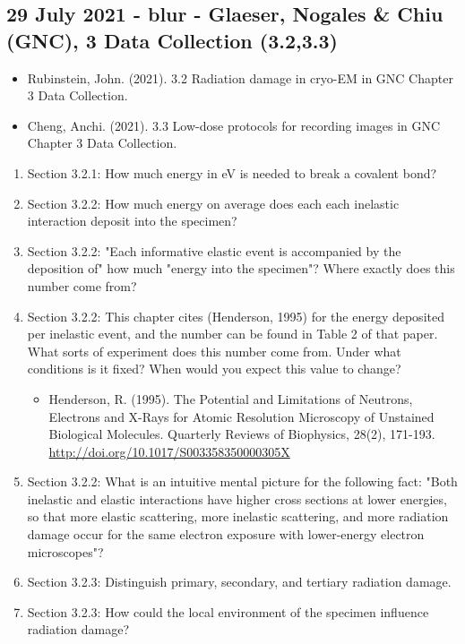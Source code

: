 \documentclass[11pt, oneside]{article}   	%
\begin{document}
\subsection{29 July 2021 - blur - Glaeser, Nogales \& Chiu (GNC), 3 Data Collection (3.2,3.3)}
\begin{itemize}
	\item Rubinstein, John. (2021). 3.2 Radiation damage in cryo-EM in GNC Chapter 3 Data Collection.
	\item Cheng, Anchi. (2021). 3.3 Low-dose protocols for recording images in GNC Chapter 3 Data Collection. 
\end{itemize}
\begin{enumerate}
	\item Section 3.2.1: How much energy in eV is needed to break a covalent bond?
	\item Section 3.2.2: How much energy on average does each each inelastic interaction deposit into the specimen?
	\item Section 3.2.2: "Each informative elastic event is accompanied by the deposition of" how much "energy into the specimen"? Where exactly does this number come from?
	\item Section 3.2.2: This chapter cites (Henderson, 1995) for the energy deposited per inelastic event, and the number can be found in Table 2 of that paper. What sorts of experiment does this number come from. Under what conditions is it fixed? When would you expect this value to change?
	\begin{itemize}
		\item Henderson, R. (1995). The Potential and Limitations of Neutrons, Electrons and X-Rays for Atomic Resolution Microscopy of Unstained Biological Molecules. Quarterly Reviews of Biophysics, 28(2), 171-193. \url{http://doi.org/10.1017/S003358350000305X}
	\end{itemize}
	\item Section 3.2.2: What is an intuitive mental picture for the following fact: "Both inelastic and elastic interactions have higher cross sections at lower energies, so that more elastic scattering, more inelastic scattering, and more radiation damage occur for the same electron exposure with lower-energy electron microscopes"?
	\item Section 3.2.3: Distinguish primary, secondary, and tertiary radiation damage.
	\item Section 3.2.3: How could the local environment of the specimen influence radiation damage?

\end{enumerate}
\end{document}
